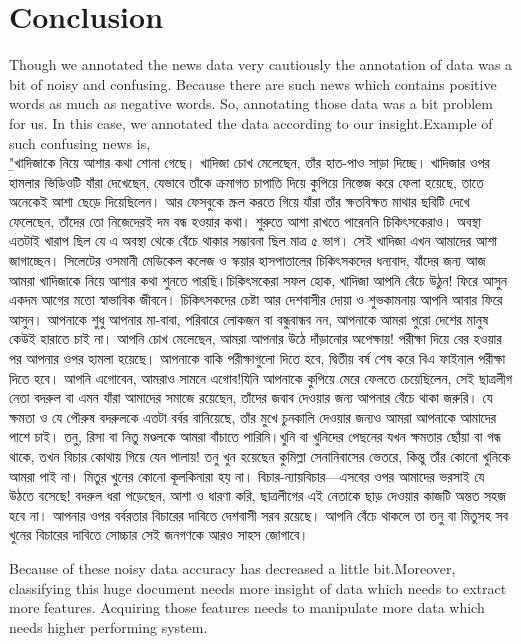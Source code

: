 \documentclass[a4paper,12pt]{report}
\begin{document}
\section{Conclusion}
Though we annotated the news data very cautiously the annotation of data was a bit of noisy and confusing. Because there are such news which contains positive words as much as negative words. So, annotating those data was a bit problem for us. In this case, we annotated the data according to our insight.Example of such confusing news is,
\\
{\b "খাদিজাকে নিয়ে আশার কথা শোনা গেছে। খাদিজা চোখ মেলেছেন, তাঁর হাত-পাও সাড়া দিচ্ছে। খাদিজার ওপর হামলার ভিডিওটি যাঁরা দেখেছেন, যেভাবে তাঁকে ক্রমাগত চাপাতি দিয়ে কুপিয়ে নিস্তেজ করে ফেলা হয়েছে, তাতে অনেকেই আশা ছেড়ে দিয়েছিলেন। আর ফেসবুকে স্ক্রল করতে গিয়ে যাঁরা তাঁর ক্ষতবিক্ষত মাথার ছবিটি দেখে ফেলেছেন, তাঁদের তো নিজেদেরই দম বন্ধ হওয়ার কথা। শুরুতে আশা রাখতে পারেননি চিকিৎসকেরাও। অবস্থা এতটাই খারাপ ছিল যে এ অবস্থা থেকে বেঁচে থাকার সম্ভাবনা ছিল মাত্র ৫ ভাগ। সেই খাদিজা এখন আমাদের আশা জাগাচ্ছেন। সিলেটের ওসমানী মেডিকেল কলেজ ও স্কয়ার হাসপাতালের চিকিৎসকদের ধন্যবাদ, যাঁদের জন্য আজ আমরা খাদিজাকে নিয়ে আশার কথা শুনতে পারছি।চিকিৎসকেরা সফল হোক, খাদিজা আপনি বেঁচে উঠুন! ফিরে আসুন একদম আগের মতো স্বাভাবিক জীবনে। চিকিৎসকদের চেষ্টা আর দেশবাসীর দোয়া ও শুভকামনায় আপনি আবার ফিরে আসুন। আপনাকে শুধু আপনার মা-বাবা, পরিবারে লোকজন বা বন্ধুবান্ধব নন, আপনাকে আমরা পুরো দেশের মানুষ কেউই হারাতে চাই না। আপনি চোখ মেলেছেন, আমরা আপনার উঠে দাঁড়ানোর অপেক্ষায়! পরীক্ষা দিয়ে বের হওয়ার পর আপনার ওপর হামলা হয়েছে। আপনাকে বাকি পরীক্ষাগুলো দিতে হবে, দ্বিতীয় বর্ষ শেষ করে বিএ ফাইনাল পরীক্ষা দিতে হবে। আপনি এগোবেন, আমরাও সামনে এগোব!যিনি আপনাকে কুপিয়ে মেরে ফেলতে চেয়েছিলেন, সেই ছাত্রলীগ নেতা বদরুল বা এমন যাঁরা আমাদের সমাজে রয়েছেন, তাঁদের জবাব দেওয়ার জন্য আপনার বেঁচে থাকা জরুরি। যে ক্ষমতা ও যে পৌরুষ বদরুলকে এতটা বর্বর বানিয়েছে, তাঁর মুখে চুনকালি দেওয়ার জন্যও আমরা আপনাকে আমাদের পাশে চাই। তনু, রিসা বা নিতু মণ্ডলকে আমরা বাঁচাতে পারিনি।খুনি বা খুনিদের পেছনের যখন ক্ষমতার ছোঁয়া বা গন্ধ থাকে, তখন বিচার কোথায় গিয়ে যেন পালায়! তনু খুন হয়েছেন কুমিল্লা সেনানিবাসের ভেতরে, কিন্তু তাঁর কোনো খুনিকে আমরা পাই না। মিতুর খুনের কোনো কূলকিনারা হয় না। বিচার-ন্যায়বিচার—এসবের ওপর আমাদের ভরসাই যে উঠতে বসেছে! বদরুল ধরা পড়েছেন, আশা ও ধারণা করি, ছাত্রলীগের এই নেতাকে ছাড় দেওয়ার কাজটি অন্তত সহজ হবে না। আপনার ওপর বর্বরতার বিচারের দাবিতে দেশবাসী সরব রয়েছে। আপনি বেঁচে থাকলে তা তনু বা মিতুসহ সব খুনের বিচারের দাবিতে সোচ্চার সেই জনগণকে আরও সাহস জোগাবে।
}

Because of these noisy data accuracy has decreased a little bit.Moreover,  classifying this huge document needs more insight of data which needs to extract more features. Acquiring those features needs to manipulate more data which needs higher performing system.
\end{document}
